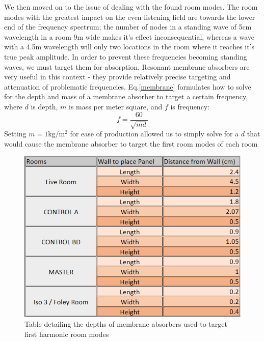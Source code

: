 \documentclass[10pt, twocolumn]{article}
\begin{document}
        We then moved on to the issue of dealing with the found room modes.
        The room modes with the greatest impact on the even listening field are towards the lower end of the frequency spectrum; the number of nodes in a standing wave of 5cm wavelength in a room 9m wide makes it's effect inconsequential, whereas a wave with a 4.5m wavelength will only two locations in the room where it reaches it's true peak amplitude.
        In order to prevent these frequencies becoming standing waves, we must target them for absorption.
        Resonant membrane absorbers are very useful in this context - they provide relatively precise targeting and attenuation of problematic frequencies.
        Eq.\ref{membrane} formulates how to solve for the depth and mass of a membrane absorber to target a certain frequency, where $d$ is depth, $m$ is mass per meter square, and $f$ is frequency:
        \begin{equation}\label{membrane}
            f = \frac{60}{\sqrt{md}}
        \end{equation}
        Setting $m=1\si{\kilogram\per\meter\squared}$ for ease of production allowed us to simply solve for a $d$ that would cause the membrane absorber to target the first room modes of each room
        \begin{figure}[H]
            \centering
            \includegraphics[scale=0.7]{resources/membrane.png}
            \caption{Table detailing the depths of membrane absorbers used to target first harmonic room modes}
            \label{membranetable}
        \end{figure}
\end{document}
